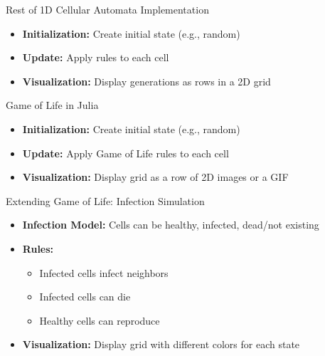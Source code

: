 \begin{frame}{Rest of 1D Cellular Automata Implementation}
    \begin{itemize}
        \item \textbf{Initialization:} Create initial state (e.g., random)
        \item \textbf{Update:} Apply rules to each cell
        \item \textbf{Visualization:} Display generations as rows in a 2D grid
    \end{itemize}
\end{frame}

\begin{frame}{Game of Life in Julia}
    \begin{itemize}
        \item \textbf{Initialization:} Create initial state (e.g., random)
        \item \textbf{Update:} Apply Game of Life rules to each cell
        \item \textbf{Visualization:} Display grid as a row of 2D images or a GIF
    \end{itemize}

\end{frame}

\begin{frame}{Extending Game of Life: Infection Simulation}
    \begin{itemize}
        \item \textbf{Infection Model:} Cells can be healthy, infected, dead/not existing
        \item \textbf{Rules:}
              \begin{itemize}
                  \item Infected cells infect neighbors
                  \item Infected cells can die
                  \item Healthy cells can reproduce
              \end{itemize}
        \item \textbf{Visualization:} Display grid with different colors for each state
    \end{itemize}

\end{frame}


